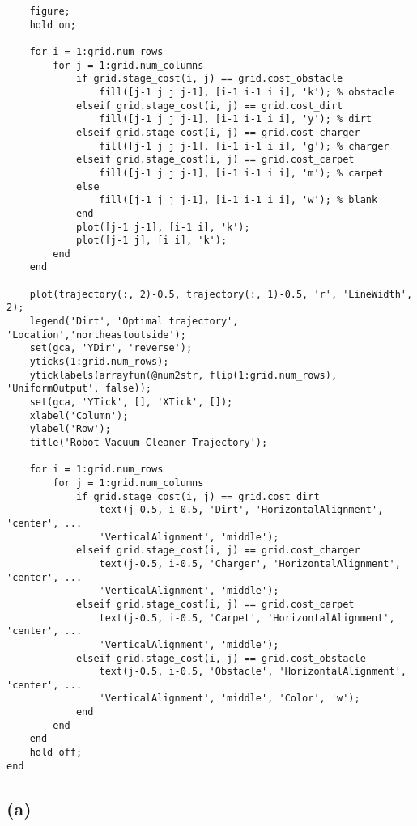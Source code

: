 \documentclass[8pt, a4paper, oneside, justified]{article}
\numberwithin{equation}{section}
\begin{document}
\begin{lstlisting}
    figure;
    hold on;
    
    for i = 1:grid.num_rows
        for j = 1:grid.num_columns
            if grid.stage_cost(i, j) == grid.cost_obstacle
                fill([j-1 j j j-1], [i-1 i-1 i i], 'k'); % obstacle
            elseif grid.stage_cost(i, j) == grid.cost_dirt
                fill([j-1 j j j-1], [i-1 i-1 i i], 'y'); % dirt
            elseif grid.stage_cost(i, j) == grid.cost_charger
                fill([j-1 j j j-1], [i-1 i-1 i i], 'g'); % charger
            elseif grid.stage_cost(i, j) == grid.cost_carpet
                fill([j-1 j j j-1], [i-1 i-1 i i], 'm'); % carpet
            else
                fill([j-1 j j j-1], [i-1 i-1 i i], 'w'); % blank
            end
            plot([j-1 j-1], [i-1 i], 'k');
            plot([j-1 j], [i i], 'k');
        end
    end
    
    plot(trajectory(:, 2)-0.5, trajectory(:, 1)-0.5, 'r', 'LineWidth', 2);
    legend('Dirt', 'Optimal trajectory', 'Location','northeastoutside');
    set(gca, 'YDir', 'reverse');
    yticks(1:grid.num_rows);
    yticklabels(arrayfun(@num2str, flip(1:grid.num_rows), 'UniformOutput', false));
    set(gca, 'YTick', [], 'XTick', []);
    xlabel('Column');
    ylabel('Row');
    title('Robot Vacuum Cleaner Trajectory');
    
    for i = 1:grid.num_rows
        for j = 1:grid.num_columns
            if grid.stage_cost(i, j) == grid.cost_dirt
                text(j-0.5, i-0.5, 'Dirt', 'HorizontalAlignment', 'center', ...
                'VerticalAlignment', 'middle');
            elseif grid.stage_cost(i, j) == grid.cost_charger
                text(j-0.5, i-0.5, 'Charger', 'HorizontalAlignment', 'center', ...
                'VerticalAlignment', 'middle');
            elseif grid.stage_cost(i, j) == grid.cost_carpet
                text(j-0.5, i-0.5, 'Carpet', 'HorizontalAlignment', 'center', ...
                'VerticalAlignment', 'middle');
            elseif grid.stage_cost(i, j) == grid.cost_obstacle
                text(j-0.5, i-0.5, 'Obstacle', 'HorizontalAlignment', 'center', ...
                'VerticalAlignment', 'middle', 'Color', 'w');
            end
        end
    end
    hold off;
end
\end{lstlisting}

\subsection*{(a)}
\end{document}
